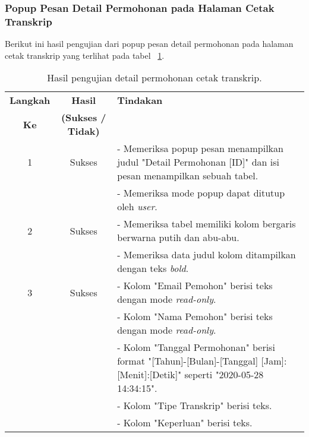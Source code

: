 \subsubsection{Popup Pesan Detail Permohonan pada Halaman Cetak Transkrip}
Berikut ini hasil pengujian dari popup pesan detail permohonan pada halaman cetak transkrip yang terlihat pada tabel ~\ref{hasil:DetailCetakTranskrip}.
\begin{table}[H]
	\centering 
	\caption{Hasil pengujian detail permohonan cetak transkrip.}
	\label{hasil:DetailCetakTranskrip}
	\begin{tabular}{|c| c| p{}|}
		\toprule
		\textbf{Langkah} & \textbf{Hasil} & \textbf{Tindakan}\\
		\textbf{Ke} & \textbf{(Sukses / Tidak)} &\\
		\midrule
		1&Sukses& - Memeriksa popup pesan menampilkan judul "Detail Permohonan [ID]" dan isi pesan menampilkan sebuah tabel.\\
		&& - Memeriksa mode popup dapat ditutup oleh \textit{user}.\\
		\hline
		2&Sukses&- Memeriksa tabel memiliki kolom bergaris berwarna putih dan abu-abu.\\
		&& - Memeriksa data judul kolom ditampilkan dengan teks \textit{bold}.	\\	
		\hline
		3&Sukses&- Kolom "Email Pemohon" berisi teks dengan mode \textit{read-only}.\\
		&&- Kolom "Nama Pemohon" berisi teks dengan mode \textit{read-only}.\\
		&&- Kolom "Tanggal Permohonan" berisi format "[Tahun]-[Bulan]-[Tanggal] [Jam]:[Menit]:[Detik]" seperti "2020-05-28 14:34:15".\\
		&&- Kolom "Tipe Transkrip" berisi teks.\\
		&&- Kolom "Keperluan" berisi teks.\\
		\bottomrule		
	\end{tabular} 
\end{table}

